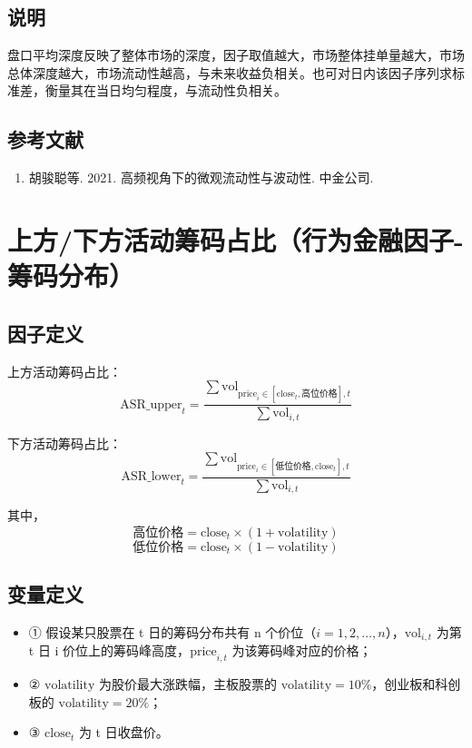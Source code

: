 \documentclass{article}
\begin{document}
\subsection{说明}
盘口平均深度反映了整体市场的深度，因子取值越大，市场整体挂单量越大，市场总体深度越大，市场流动性越高，与未来收益负相关。也可对日内该因子序列求标准差，衡量其在当日均匀程度，与流动性负相关。

\subsection{参考文献}
\begin{enumerate}
    \item 胡骏聪等. 2021. 高频视角下的微观流动性与波动性. 中金公司.
\end{enumerate}

\section{上方/下方活动筹码占比（行为金融因子-筹码分布）}

\subsection{因子定义}

上方活动筹码占比：
\begin{equation}
    \mathrm{ASR\_upper}_t = \frac{\sum \mathrm{vol}_{\mathrm{price}_{i} \in [\mathrm{close}_t, \text{高位价格}],t}}{\sum \mathrm{vol}_{i,t}}
\end{equation}

下方活动筹码占比：
\begin{equation}
    \mathrm{ASR\_lower}_t = \frac{\sum \mathrm{vol}_{\mathrm{price}_{i} \in [\text{低位价格},\mathrm{close}_t],t}}{\sum \mathrm{vol}_{i,t}}
\end{equation}

其中，
\begin{equation}
    \text{高位价格} = \mathrm{close}_t \times (1 + \mathrm{volatility})
\end{equation}
\begin{equation}
    \text{低位价格} = \mathrm{close}_t \times (1 - \mathrm{volatility})
\end{equation}

\subsection{变量定义}
\begin{itemize}
    \item ① 假设某只股票在 t 日的筹码分布共有 n 个价位（\( i = 1, 2, \ldots, n \)），\( \mathrm{vol}_{i,t} \) 为第 t 日 i 价位上的筹码峰高度，\( \mathrm{price}_{i,t} \) 为该筹码峰对应的价格；
    \item ② \( \mathrm{volatility} \) 为股价最大涨跌幅，主板股票的 \( \mathrm{volatility} = 10\% \)，创业板和科创板的 \( \mathrm{volatility} = 20\% \)；
    \item ③ \( \mathrm{close}_t \) 为 t 日收盘价。
\end{itemize}
\end{document}
